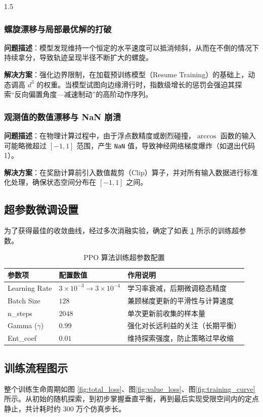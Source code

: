 \documentclass[zihao=-4]{ctexart}
\let\p\par
\begin{document}
\begin{spacing}{1.5}
\subsubsection{螺旋漂移与局部最优解的打破}
\textbf{问题描述}：模型发现维持一个恒定的水平速度可以抵消倾斜，从而在不倒的情况下持续拿分，导致轨迹呈现半径不断扩大的螺旋。
\p \textbf{解决方案}：强化边界限制，在加载预训练模型（Resume Training）的基础上，动态调高 $d^3$ 的权重。当模型试图向边缘滑行时，指数级增长的惩罚会强迫其探索“反向偏置角度—减速制动”的高阶动作序列。

\subsubsection{观测值的数值漂移与 NaN 崩溃}
\textbf{问题描述}：在物理计算过程中，由于浮点数精度或剧烈碰撞，$\arccos$ 函数的输入可能略微超过 $[-1, 1]$ 范围，产生 \texttt{NaN} 值，导致神经网络梯度爆炸（如退出代码 1）。
\p \textbf{解决方案}：在奖励计算前引入数值裁剪（Clip）算子，并对所有输入数据进行标准化处理，确保状态空间分布在 $[-1, 1]$ 之间。

\subsection{超参数微调设置}
为了获得最佳的收敛曲线，经过多次消融实验，确定了如表 \ref{tab:hyperparams} 所示的训练超参数。

\begin{table}[H]
\small
\caption{PPO 算法训练超参数配置}
\centering
\begin{tabular}{lll}
\toprule
\textbf{参数项} & \textbf{配置数值} & \textbf{作用说明} \\ 
\midrule
Learning Rate & $3 \times 10^{-3} \to 3 \times 10^{-4}$ & 学习率衰减，后期微调稳态精度 \\
Batch Size & $128$ & 兼顾梯度更新的平滑性与计算速度 \\
n\_steps & $2048$ & 单次更新前收集的样本量 \\
Gamma ($\gamma$) & $0.99$ & 强化对长远利益的关注（长期平衡） \\
Ent\_coef & $0.01$ & 维持探索强度，防止策略过早收缩 \\
\bottomrule
\end{tabular} 
\label{tab:hyperparams}
\end{table}

\subsection{训练流程图示}
整个训练生命周期如图 \ref{fig:total_loss}、图\ref{fig:value_loss}、图\ref{fig:training_curve} 所示。从初始的随机探索，到初步掌握垂直平衡，再到最后实现受限空间内的定点静止，共计耗时约 300 万个仿真步长。


\end{spacing}
\end{document}
